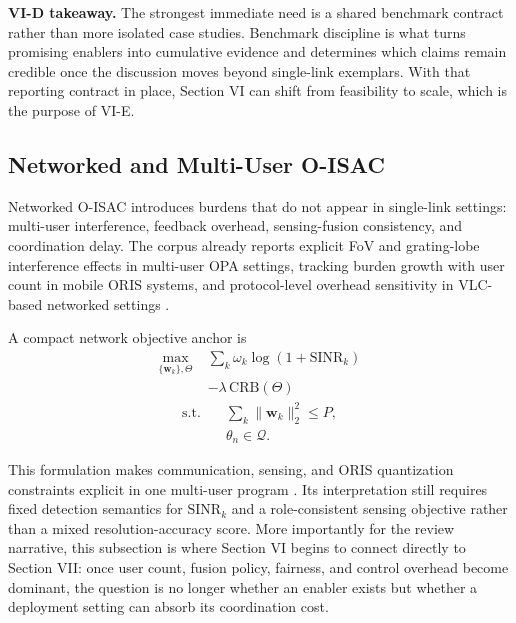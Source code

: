 \documentclass[lettersize,journal]{IEEEtran}
\begin{document}
\textbf{VI-D takeaway.} The strongest immediate need is a shared benchmark contract rather than more isolated case studies. Benchmark discipline is what turns promising enablers into cumulative evidence and determines which claims remain credible once the discussion moves beyond single-link exemplars. With that reporting contract in place, Section VI can shift from feasibility to scale, which is the purpose of VI-E.

\subsection{Networked and Multi-User O-ISAC}

Networked O-ISAC introduces burdens that do not appear in single-link settings: multi-user interference, feedback overhead, sensing-fusion consistency, and coordination delay. The corpus already reports explicit FoV and grating-lobe interference effects in multi-user OPA settings, tracking burden growth with user count in mobile ORIS systems, and protocol-level overhead sensitivity in VLC-based networked settings \cite{O_ISAC_009,O_ISAC_061,O_ISAC_091,O_ISAC_098,O_ISAC_303}.

A compact network objective anchor is
\begin{equation}
\begin{split}
\max_{\{\mathbf{w}_k\},\Theta}\;&\sum_{k}\omega_k\log\!\left(1+\mathrm{SINR}_k\right)\\
&-\lambda\,\mathrm{CRB}(\Theta)
\end{split}
\end{equation}
\begin{equation}
\begin{split}
\text{s.t.}\quad &\sum_k\|\mathbf{w}_k\|_2^2\le P,\\
&\theta_n\in\mathcal Q.
\end{split}
\end{equation}

This formulation makes communication, sensing, and ORIS quantization constraints explicit in one multi-user program \cite{O_ISAC_061,O_ISAC_091,O_ISAC_127}. Its interpretation still requires fixed detection semantics for $\mathrm{SINR}_k$ and a role-consistent sensing objective rather than a mixed resolution-accuracy score. More importantly for the review narrative, this subsection is where Section VI begins to connect directly to Section VII: once user count, fusion policy, fairness, and control overhead become dominant, the question is no longer whether an enabler exists but whether a deployment setting can absorb its coordination cost.
\end{document}
